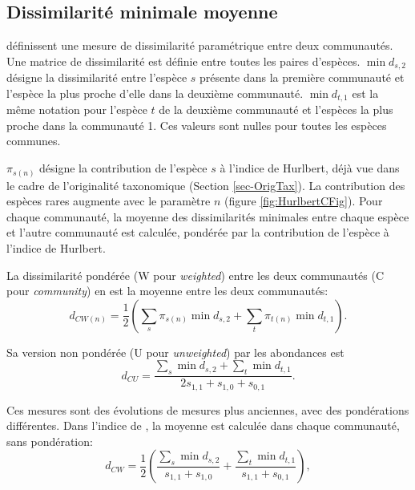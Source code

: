 \documentclass[
  11pt,
  french,
  a4paper,
  extrafontsizes,onecolumn,openright
  ]{memoir}
\begin{document}
\hypertarget{dissimilarituxe9-minimale-moyenne}{%
\subsection{Dissimilarité minimale moyenne}\label{dissimilarituxe9-minimale-moyenne}}

\textcite{Ricotta2010} définissent une mesure de dissimilarité paramétrique entre deux communautés.
Une matrice de dissimilarité est définie entre toutes les paires d'espèces.
\(\min{d_{s,2}}\) désigne la dissimilarité entre l'espèce \(s\) présente dans la première communauté et l'espèce la plus proche d'elle dans la deuxième communauté.
\(\min{d_{t,1}}\) est la même notation pour l'espèce \(t\) de la deuxième communauté et l'espèces la plus proche dans la communauté 1.
Ces valeurs sont nulles pour toutes les espèces communes.

\(\pi_{s(n)}\) désigne la contribution de l'espèce \(s\) à l'indice de Hurlbert, déjà vue dans le cadre de l'originalité taxonomique (Section \ref{sec-OrigTax}).
La contribution des espèces rares augmente avec le paramètre \(n\) (figure \ref{fig:HurlbertCFig}).
Pour chaque communauté, la moyenne des dissimilarités minimales entre chaque espèce et l'autre communauté est calculée, pondérée par la contribution de l'espèce à l'indice de Hurlbert.

La dissimilarité pondérée (W pour \emph{weighted}) entre les deux communautés (C pour \emph{community}) en est la moyenne entre les deux communautés:
\begin{equation}
  \label{eq:CWn}
  d_{\mathit{CW}(n)} = \frac{1}{2}\left(\sum_s{\pi_{s(n)} \min{d_{s,2}}} + \sum_t{\pi_{t(n)} \min{d_{t,1}}} \right).
\end{equation}

Sa version non pondérée (U pour \emph{unweighted}) par les abondances est \autocite{Ricotta2008}
\begin{equation}
  \label{eq:CU}
  d_{\mathit{CU}} = \frac{\sum_s{\min{d_{s,2}}} + \sum_t{\min{d_{t,1}}}}{2s_{1,1}+s_{1,0}+s_{0,1}}.
\end{equation}

Ces mesures sont des évolutions de mesures plus anciennes, avec des pondérations différentes.
Dans l'indice de \textcite{Clarke1998}, la moyenne est calculée dans chaque communauté, sans pondération:
\begin{equation}
  \label{eq:CW}
  d_{\mathit{CW}} = \frac{1}{2}\left( \frac{\sum_s{\min{d_{s,2}}}}{s_{1,1}+s_{1,0}} + \frac{\sum_t{\min{d_{t,1}}}}{s_{1,1}+s_{0,1}} \right),
\end{equation}
\end{document}
